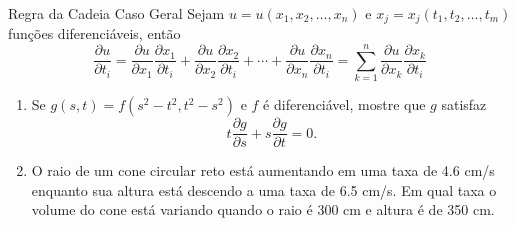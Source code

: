 \begin{frame}[label=der-parciais]
	\frametitle{ }
\begin{block}{Regra da Cadeia Caso Geral}
Sejam $u=u(x_1,x_2,\ldots,x_n)$ e $x_j=x_j(t_1,t_2,\ldots,t_m)$ funções diferenciáveis, então
\[\frac{\partial u}{\partial t_i}=\frac{\partial u}{\partial x_1}\frac{\partial x_1}{\partial t_i}+\frac{\partial u}{\partial x_2}\frac{\partial x_2}{\partial t_i}+\cdots +\frac{\partial u}{\partial x_n}\frac{\partial x_n}{\partial t_i}=\sum_{k=1}^{n}\frac{\partial u}{\partial x_k}\frac{\partial x_k}{\partial t_i}
\]
\end{block}

		
\end{frame}


\begin{frame}[label=der-parciais]
\begin{casa}
\begin{enumerate}
\item Se $g(s,t)=f(s^2-t^2,t^2-s^2)$ e $f$ é diferenciável, mostre que $g$ satisfaz
\[t\frac{\partial g}{\partial s}+s\frac{\partial g}{\partial t}=0.\]

\item O raio de um cone circular reto está aumentando em uma taxa de 4.6 cm/s enquanto sua altura está descendo a uma taxa de 6.5 cm/s. Em qual taxa o volume do cone está variando quando o raio é 300 cm e altura é de 350 cm.
\end{enumerate}
\end{casa}
\end{frame}

